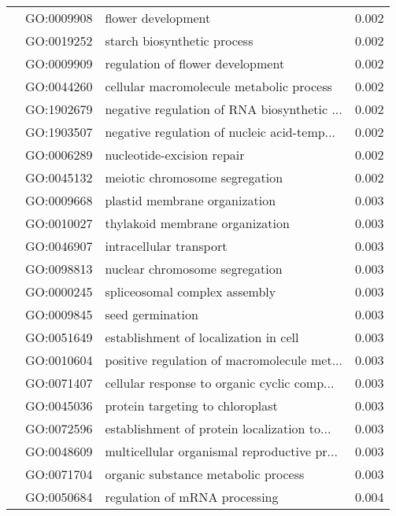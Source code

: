\begin{longtable}{lllr}
   & GO:0009908 &                           flower development &         0.002 \\
   & GO:0019252 &                  starch biosynthetic process &         0.002 \\
   & GO:0009909 &             regulation of flower development &         0.002 \\
   & GO:0044260 &     cellular macromolecule metabolic process &         0.002 \\
   & GO:1902679 &  negative regulation of RNA biosynthetic ... &         0.002 \\
   & GO:1903507 &  negative regulation of nucleic acid-temp... &         0.002 \\
   & GO:0006289 &                   nucleotide-excision repair &         0.002 \\
   & GO:0045132 &               meiotic chromosome segregation &         0.002 \\
   & GO:0009668 &                plastid membrane organization &         0.003 \\
   & GO:0010027 &              thylakoid membrane organization &         0.003 \\
   & GO:0046907 &                      intracellular transport &         0.003 \\
   & GO:0098813 &               nuclear chromosome segregation &         0.003 \\
   & GO:0000245 &                spliceosomal complex assembly &         0.003 \\
   & GO:0009845 &                             seed germination &         0.003 \\
   & GO:0051649 &        establishment of localization in cell &         0.003 \\
   & GO:0010604 &  positive regulation of macromolecule met... &         0.003 \\
   & GO:0071407 &  cellular response to organic cyclic comp... &         0.003 \\
   & GO:0045036 &             protein targeting to chloroplast &         0.003 \\
   & GO:0072596 &  establishment of protein localization to... &         0.003 \\
   & GO:0048609 &  multicellular organismal reproductive pr... &         0.003 \\
   & GO:0071704 &          organic substance metabolic process &         0.003 \\
   & GO:0050684 &                regulation of mRNA processing &         0.004 \\

\end{longtable}
